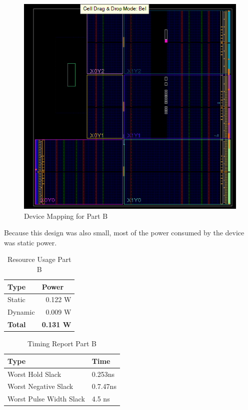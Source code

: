 \documentclass[letterpaper, 10 pt, conference]{IEEEconf}  %
\begin{document}
\begin{figure}[thpb]
   \centering
   \parbox{3in}{\centering\includegraphics[scale=0.35]{img/partb_chip.png}}
   \caption{Device Mapping for Part B}
   \label{figurelabel}
\end{figure}

Because this design was also small,  most of the power consumed by the device was static power. 
\begin{table}[]
\centering
\caption{Resource Usage Part B}
\label{table_example}
\begin{tabular}{|l|r|}
\hline
\rowcolor[HTML]{EFEFEF} 
Type    & \multicolumn{1}{l|}{\cellcolor[HTML]{EFEFEF}Power} \\ \hline
Static  & 0.122 W                                            \\ \hline
Dynamic & 0.009 W                                            \\ \hline
\textbf{Total} & \textbf{0.131 W}                            \\ \hline
\end{tabular}
\end{table}


\begin{table}[]
\centering
\caption{Timing Report Part B}
\label{table_example}
\begin{tabular}{|l|l|}
\hline
\rowcolor[HTML]{EFEFEF} 
Type    & Time \\ \hline
Worst Hold Slack  &  0.253ns  \\ \hline
Worst Negative Slack & 0.7.47ns \\ \hline
Worst Pulse Width Slack & 4.5 ns \\ \hline
\end{tabular}
\end{table}
\end{document}
